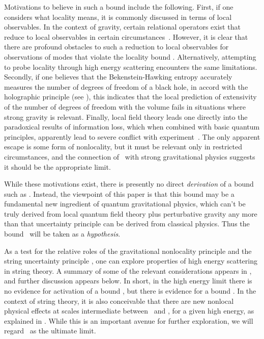 Motivations to believe in such a bound include the following.  First, if one considers what locality means, it is commonly discussed in terms of local observables.  In the context of gravity, certain relational operators exist that reduce to local observables in certain circumstances~.  However, it is clear that there are profound obstacles to such a reduction to local observables for observations of modes that violate the locality bound \gravbd.  Alternatively, attempting to probe locality through high energy scattering encounters the same limitations\LQGST.
Secondly, if one believes that the Bekenstein-Hawking entropy accurately measures the number of degrees of freedom of a black hole, in accord with the holographic principle (see ), this indicates that the local prediction of extensivity of the number of degrees of freedom with  the volume fails in situations where strong gravity is relevant.  Finally, local field theory leads one directly into the paradoxical results of information loss, which when combined with basic quantum principles, apparently lead to severe conflict with experiment~.  The only apparent escape is some form of nonlocality, but it must be relevant only in restricted circumstances, and the connection of \gravbd\ with strong gravitational physics suggests it should be the appropriate limit.  

While these motivations exist, there is presently no direct {\it derivation} of a bound such as \gravbd.  Instead, the viewpoint of this paper is that this bound may be a fundamental new ingredient of quantum gravitational physics, which can't be truly derived from local quantum field theory plus perturbative gravity any more than that uncertainty principle can be derived from classical physics.  Thus the bound \gravbd\ will be taken as a {\it hypothesis}.

As a test for the relative roles of the gravitational nonlocality principle and the string uncertainty principle \genunc, one can explore properties of high energy scattering in string theory.  A summary of some of the relevant considerations appears in \LQGST, and further discussion appears below.  In short, in the high energy limit there is no evidence for activation of a bound \genunc, but there is evidence for a bound \gravbd.  In the context of string theory, it is also conceivable that there are new nonlocal physical effects at scales intermediate between \genunc\ and \gravbd, for a given high energy, as explained in \LQGST.   While this is an important avenue for further exploration, we will regard \gravbd\ as the ultimate limit.

